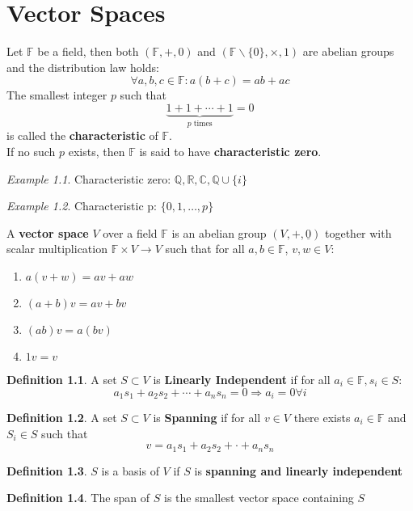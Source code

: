 \documentclass[11pt, a4paper]{report}
\numberwithin{equation}{section}
\newcommand{\bk}{\backslash}
\newcommand{\R}{\mathbb{R}}
\newcommand{\C}{\mathbb{C}}
\newcommand{\F}{\mathbb{F}}
\newcommand{\Q}{\mathbb{Q}}
\numberwithin{equation}{subsection}
\theoremstyle{plain}
\theoremstyle{definition}
\newtheorem{defn}{Definition}[chapter]
\theoremstyle{remark}
\newtheorem{exmp}{Example}[chapter]
\begin{document}
\tableofcontents

\newpage

\chapter{Vector Spaces}
Let $\F$ be a field, then both $(\F, + , 0)$ and $(\F \bk \{0\}, \times, 1)$ are abelian groups and the distribution law holds:
$$\forall a,b,c \in \F : a(b+c) = ab + ac$$
The smallest integer $p$ such that
$$\underbrace{1 + 1 + \cdots + 1}_{p \text{ times}} = 0$$
is called the \textbf{characteristic} of $\F$.\\
If no such $p$ exists, then $\F$ is said to have \textbf{characteristic zero}.

\begin{exmp} Characteristic zero: $\Q, \R, \C, \Q \cup \{ i \}$ \end{exmp}
\begin{exmp} Characteristic p: $\{ 0, 1, \ldots, p \}$ \end{exmp}

A \textbf{vector space} $V$ over a field $\F$ is an abelian group $(V, +, \underline{0})$ together with scalar multiplication $\F \times V \rightarrow V$ such that for all $a, b \in \F$, $v,w \in V$:
\begin{enumerate}[(1) ]
\item $a (v + w) = av + aw$
\item $(a + b) v = av + bv$
\item $(ab) v = a (bv)$
\item $1v = v$
\end{enumerate}

\begin{defn} A set $S \subset V$ is \textbf{Linearly Independent} if for all $a_i \in \F, s_i \in S$:
$$ a_1 s_1 + a_2 s_2 + \cdots + a_n s_n = 0 \Rightarrow a_i = 0 \forall i $$
\end{defn}

\begin{defn} A set $S \subset V$ is \textbf{Spanning} if for all $v \in V$ there exists $a_i \in \F$ and $S_i \in S$ such that
$$ v = a_1 s_1 + a_2 s_2 + \cdot + a_n s_n $$
\end{defn}

\begin{defn} $S$ is a basis of $V$ if $S$ is \textbf{spanning and linearly independent} \end{defn}

\begin{defn} The span of $S$ is the smallest vector space containing $S$ \end{defn}
\end{document}
